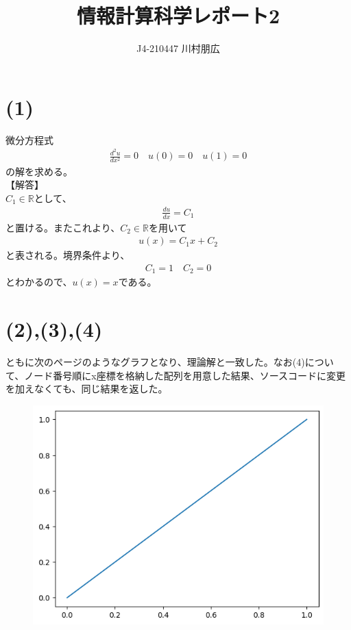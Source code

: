 \documentclass[pdflatex,ja=standard,fleqn]{bxjsarticle}
\title{情報計算科学レポート2}
\author{J4-210447 川村朋広}
\begin{document}
\maketitle
\section*{(1)}
微分方程式
\begin{eqnarray*}
    \frac{d^2u}{dx^2}=0\quad
    u(0)=0\quad
    u(1)=0
\end{eqnarray*}
の解を求める。\\
【解答】\\
$C_{1}\in\mathbb{R}$として、
\begin{eqnarray*}
    \frac{du}{dx}=C_{1}
\end{eqnarray*}
と置ける。またこれより、$C_{2}\in\mathbb{R}$を用いて
\begin{eqnarray*}
    u(x)=C_{1}x+C_{2}
\end{eqnarray*}
と表される。境界条件より、
\begin{eqnarray*}
    C_{1}=1\quad
    C_{2}=0
\end{eqnarray*}
とわかるので、$u(x)=x$である。
\section*{(2),(3),(4)}
ともに次のページのようなグラフとなり、理論解と一致した。なお(4)について、ノード番号順にx座標を格納した配列を用意した結果、ソースコードに変更を加えなくても、同じ結果を返した。
\begin{figure}[htbp]
    \includegraphics{output.png}
\end{figure}
\end{document}
